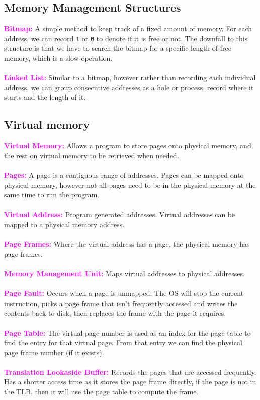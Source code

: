 \documentclass[a4paper,10pt]{article}
\begin{document}
\subsection{Memory Management Structures}
\textcolor{Magenta}{\textbf{Bitmap:}} A simple method to keep track of a fixed amount of memory. For each address, we can record \texttt{1} or \texttt{0} to denote if it is free or not. The downfall to this structure is that we have to search the bitmap for a specific length of free memory, which is a slow operation. \\\\
\textcolor{Magenta}{\textbf{Linked List:}} Similar to a bitmap, however rather than recording each individual address, we can group consecutive addresses as a hole or process, record where it starts and the length of it. 
\subsection{Virtual memory}
\textcolor{Magenta}{\textbf{Virtual Memory:}} Allows a program to store pages onto physical memory, and the rest on virtual memory to be retrieved when needed. \\\\
\textcolor{Magenta}{\textbf{Pages:}} A page is a contiguous range of addresses. Pages can be mapped onto physical memory, however not all pages need to be in the physical memory at the same time to run the program.\\\\ 
\textcolor{Magenta}{\textbf{Virtual Address:}} Program generated addresses. Virtual addresses can be mapped to a physical memory address. \\\\
\textcolor{Magenta}{\textbf{Page Frames:}} Where the virtual address has a page, the physical memory has page frames. \\\\
\textcolor{Magenta}{\textbf{Memory Management Unit:}} Maps virtual addresses to physical addresses. \\\\
\textcolor{Magenta}{\textbf{Page Fault:}} Occurs when a page is unmapped. The OS will stop the current instruction, picks a page frame that isn't frequently accessed and writes the contents back to disk, then replaces the frame with the page it requires. \\\\
\textcolor{Magenta}{\textbf{Page Table:}} The virtual page number is used as an index for the page table to find the entry for that virtual page. From that entry we can find the physical page frame number (if it exists). \\\\
\textcolor{Magenta}{\textbf{Translation Lookaside Buffer:}} Records the pages that are accessed frequently. Has a shorter access time as it stores the page frame directly, if the page is not in the TLB, then it will use the page table to compute the frame.
\end{document}
